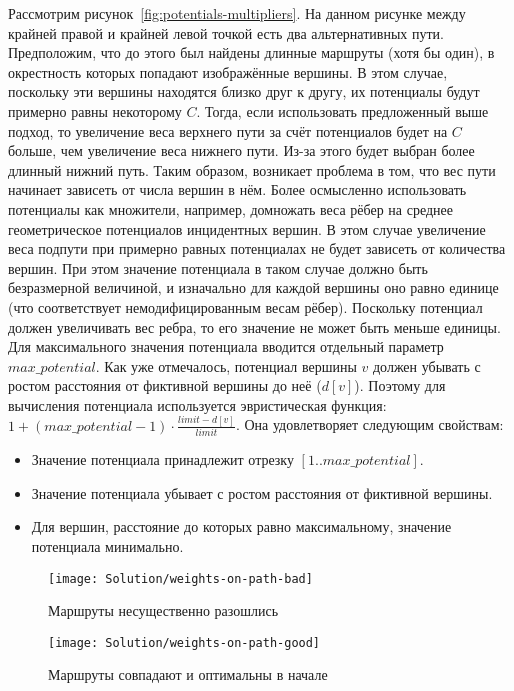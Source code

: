 Рассмотрим рисунок~\ref{fig:potentials-multipliers}. На данном рисунке
между крайней правой и крайней левой точкой есть два альтернативных
пути. Предположим, что до этого был найдены длинные маршруты (хотя бы
один), в окрестность которых попадают изображённые вершины. В этом
случае, поскольку эти вершины находятся близко друг к другу, их
потенциалы будут примерно равны некоторому $C$. Тогда, если
использовать предложенный выше подход, то увеличение веса верхнего
пути за счёт потенциалов будет на $C$ больше, чем увеличение веса
нижнего пути. Из-за этого будет выбран более длинный нижний путь.
Таким образом, возникает проблема в том, что вес пути начинает
зависеть от числа вершин в нём. Более осмысленно использовать
потенциалы как множители, например, домножать веса рёбер на среднее
геометрическое потенциалов инцидентных вершин. В этом случае
увеличение веса подпути при примерно равных потенциалах не будет
зависеть от количества вершин. При этом значение потенциала в таком
случае должно быть безразмерной величиной, и изначально для каждой
вершины оно равно единице (что соответствует немодифицированным весам
рёбер). Поскольку потенциал должен увеличивать вес ребра, то его
значение не может быть меньше единицы. Для максимального значения
потенциала вводится отдельный параметр $max\_potential$. Как уже
отмечалось, потенциал вершины $v$ должен убывать с ростом расстояния
от фиктивной вершины до неё ($d[v]$). Поэтому для вычисления
потенциала используется эвристическая функция:
$1 + (max\_potential - 1) \cdot \frac{limit - d[v]}{limit}$. Она
удовлетворяет следующим свойствам:
\begin{itemize}
    \item Значение потенциала принадлежит отрезку $[1 .. max\_potential]$.
    \item Значение потенциала убывает с ростом расстояния от фиктивной
      вершины.
    \item Для вершин, расстояние до которых равно максимальному, значение
      потенциала минимально.
\end{itemize}

\begin{figure}
    \texttt{[image: Solution/weights-on-path-bad]}
    \caption{Маршруты несущественно разошлись}
    \label{fig:weights-on-path-bad}
\end{figure}

\begin{figure}
    \texttt{[image: Solution/weights-on-path-good]}
    \caption{Маршруты совпадают и оптимальны в начале}
    \label{fig:weights-on-path-good}
\end{figure}

